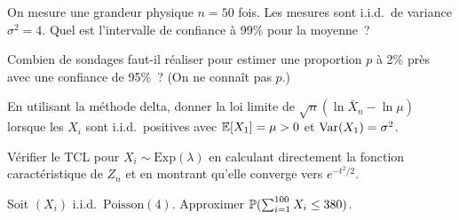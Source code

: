 \begin{exercice}
On mesure une grandeur physique $n = 50$ fois. Les mesures sont i.i.d.\ de
variance $\sigma^2 = 4$. Quel est l'intervalle de confiance \`a 99\% pour la
moyenne~?
\end{exercice}

\begin{exercice}
Combien de sondages faut-il r\'ealiser pour estimer une proportion $p$ \`a 2\%
pr\`es avec une confiance de 95\%~? (On ne conna\^it pas $p$.)
\end{exercice}

\begin{exercice}
En utilisant la m\'ethode delta, donner la loi limite de $\sqrt{n}(\ln\bar{X}_n - \ln\mu)$
lorsque les $X_i$ sont i.i.d.\ positives avec $\mathbb{E}[X_1] = \mu > 0$ et
$\mathrm{Var}(X_1) = \sigma^2$.
\end{exercice}

\begin{exercice}
V\'erifier le TCL pour $X_i \sim \text{Exp}(\lambda)$ en calculant directement
la fonction caract\'eristique de $Z_n$ et en montrant qu'elle converge vers
$e^{-t^2/2}$.
\end{exercice}

\begin{exercice}
Soit $(X_i)$ i.i.d.\ $\text{Poisson}(4)$. Approximer $\mathbb{P}(\sum_{i=1}^{100} X_i \leq 380)$.
\end{exercice}
